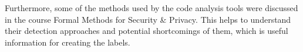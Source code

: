 \documentclass[paper=a4,fontsize=11pt,oneside,titlepage]{scrartcl}
\begin{document}
Furthermore, some of the methods used by the code analysis tools were discussed in the course Formal Methods for Security \& Privacy. This helps to understand their detection approaches and potential shortcomings of them, which is useful information for creating the labels.

\iffalse
\begin{itemize}
\item Where does the thesis fit in the Software Engineering \& Internet Computing
Master program? Which course materials are relevant?
\item Optional: Relevance to other Informatics Master programs at TU Wien
\end{itemize}
\fi

\newpage


\end{document}
